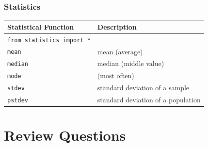 \documentclass{book}
\begin{document}
\subsubsection{Statistics}\label{statistics}

\begin{longtable}[]{@{}ll@{}}
\toprule
Statistical Function & Description\tabularnewline
\midrule
\endhead
\lstinline!from statistics import *! &\tabularnewline
\lstinline!mean! & mean (average)\tabularnewline
\lstinline!median! & median (middle value)\tabularnewline
\lstinline!mode! & (most often)\tabularnewline
\lstinline!stdev! & standard deviation of a sample\tabularnewline
\lstinline!pstdev! & standard deviation of a population\tabularnewline
\bottomrule
\end{longtable}
    




    
        \section{Review Questions}\label{review-questions}
    
\end{document}
